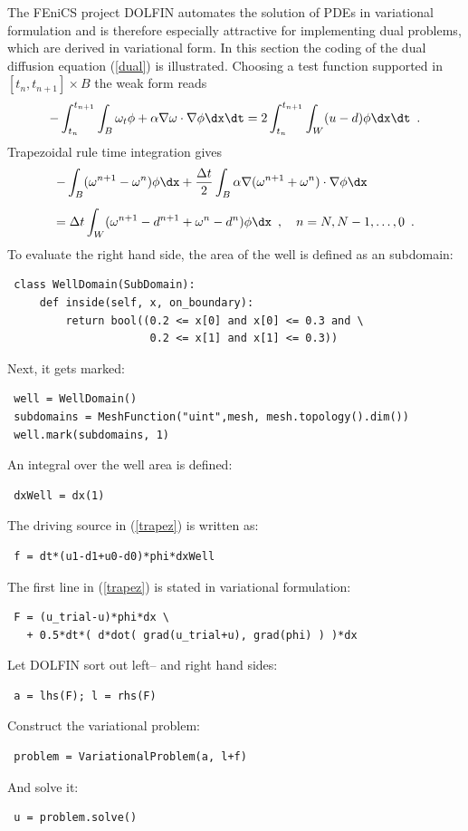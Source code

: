 The FEniCS project DOLFIN \cite{LoggWells2010} automates the solution of PDEs in variational formulation
and is therefore especially attractive for implementing dual problems,
which are derived in variational form.
In this section the coding of the dual diffusion equation
(\ref{dual}) is illustrated.
Choosing a test function supported in $[t_n, t_{n+1}] \times B$
the weak form reads
$$
 - \int_{t_n}^{t_{n+1}} \int_B \omega_t \phi + \alpha \nabla \omega \cdot \nabla \phi \dx \dt =
 2 \int_{t_n}^{t_{n+1}} \int_W (u-d) \phi \dx \dt \enspace .
$$
Trapezoidal rule time integration gives
\begin{equation} \label{trapez}
 \begin{array}{l}
 \displaystyle - \int_B (\omega^{n+1}-\omega^n) \phi \dx
     + \frac{\Delta t}{2} \int_B \alpha \nabla(\omega^{n+1}+\omega^n) \cdot \nabla \phi \dx \\[5mm]
 \displaystyle = \Delta t \int_W (\omega^{n+1} - d^{n+1} +\omega^n -d^n) \phi \dx
 \enspace , \quad n = N, N-1,\ldots, 0 \enspace .
 \end{array}
\end{equation}
To evaluate the right hand side, the area of the well is defined as an subdomain:
\begin{verbatim}
 class WellDomain(SubDomain):
     def inside(self, x, on_boundary):
         return bool((0.2 <= x[0] and x[0] <= 0.3 and \
                      0.2 <= x[1] and x[1] <= 0.3))
\end{verbatim}
Next, it gets marked:
\begin{verbatim}
 well = WellDomain()
 subdomains = MeshFunction("uint",mesh, mesh.topology().dim())
 well.mark(subdomains, 1)
\end{verbatim}
An integral over the well area is defined:
\begin{verbatim}
 dxWell = dx(1)
\end{verbatim}
\goodbreak

\noindent
The driving source in (\ref{trapez}) is written as:
\begin{verbatim}
 f = dt*(u1-d1+u0-d0)*phi*dxWell
\end{verbatim}
The first line in (\ref{trapez}) is stated in variational formulation:
\begin{verbatim}
 F = (u_trial-u)*phi*dx \
   + 0.5*dt*( d*dot( grad(u_trial+u), grad(phi) ) )*dx
\end{verbatim}
Let DOLFIN sort out left-- and right hand sides:
\begin{verbatim}
 a = lhs(F); l = rhs(F)
\end{verbatim}
Construct the variational problem:
\begin{verbatim}
 problem = VariationalProblem(a, l+f)
\end{verbatim}
And solve it:
\begin{verbatim}
 u = problem.solve()
\end{verbatim}

